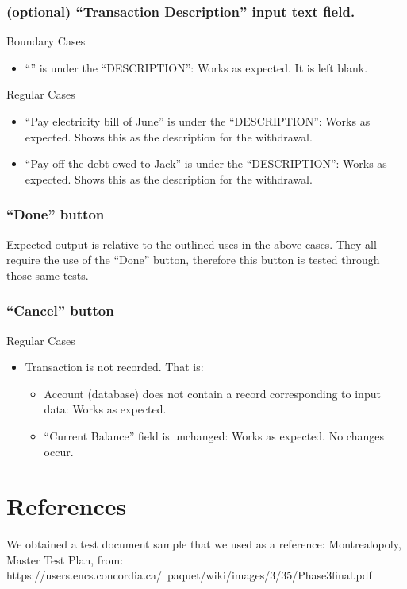 \documentclass[12pt]{article}
\begin{document}
\subsubsection{(optional) “Transaction Description” input text field.}

Boundary Cases
\begin{itemize}
  \item “” is under the “DESCRIPTION”: Works as expected. It is left blank.
\end{itemize}

Regular Cases
\begin{itemize}
  \item  “Pay electricity bill of June” is under the “DESCRIPTION”: Works as expected. Shows this as the description for the withdrawal.
  \item  “Pay off the debt owed to Jack” is under the “DESCRIPTION”: Works as expected. Shows this as the description for the withdrawal.
\end{itemize}

\subsubsection{“Done” button}

Expected output is relative to the outlined uses in the above cases. They all require the use of the “Done” button, therefore this button is tested through those same tests.
	
\subsubsection{“Cancel” button}

Regular Cases
\begin{itemize}
  \item Transaction is not recorded. That is:
  \begin{itemize}
    \item Account (database) does not contain a record corresponding to input data: Works as expected.
    \item “Current Balance” field is unchanged: Works as expected. No changes occur.
  \end{itemize}
\end{itemize}

\section{References}
We obtained a test document sample that we used as a reference: Montrealopoly, Master Test Plan, from: https://users.encs.concordia.ca/~paquet/wiki/images/3/35/Phase3final.pdf
\end{document}

